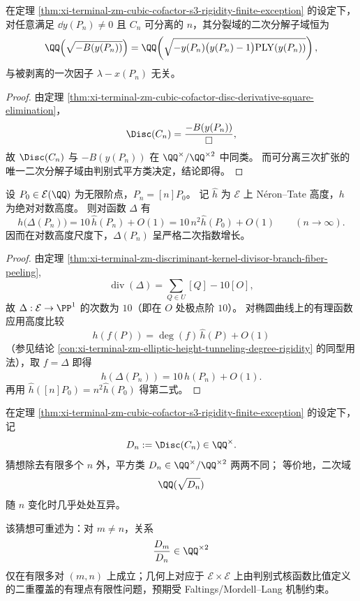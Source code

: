 \begin{corollary}[二次脊柱在一次剥离下的不变性]\label{cor:xi-terminal-zm-cubic-cofactor-quadratic-spine-invariance}
在定理 \ref{thm:xi-terminal-zm-cubic-cofactor-s3-rigidity-finite-exception} 的设定下，对任意满足 \(\dd y(P_n)\neq 0\) 且 \(C_n\) 可分离的 \(n\)，其分裂域的二次分解子域恒为
\[
\QQ\!\left(\sqrt{-B(y(P_n))}\right)
=\QQ\!\left(\sqrt{-y(P_n)\bigl(y(P_n)-1\bigr)\mathrm{PLY}(y(P_n))}\right),
\]
与被剥离的一次因子 \(\lambda-x(P_n)\) 无关。
\end{corollary}
\begin{proof}
由定理 \ref{thm:xi-terminal-zm-cubic-cofactor-disc-derivative-square-elimination}，
\[
\Disc(C_n)=\frac{-B(y(P_n))}{\square},
\]
故 \(\Disc(C_n)\) 与 \(-B(y(P_n))\) 在 \(\QQ^\times/\QQ^{\times2}\) 中同类。
而可分离三次扩张的唯一二次分解子域由判别式平方类决定，结论即得。
\end{proof}

\begin{theorem}[判别式核函数沿倍点序列的二次型高度增长]\label{thm:xi-terminal-zm-discriminant-kernel-height-quadratic-growth}
设 \(P_0\in \mathcal E(\QQ)\) 为无限阶点，\(P_n=[n]P_0\)。
记 \(\hat h\) 为 \(\mathcal E\) 上 N\'eron--Tate 高度，\(h\) 为绝对对数高度。
则对函数 \(\Delta\) 有
\[
h\!\bigl(\Delta(P_n)\bigr)=10\,\hat h(P_n)+O(1)
=10\,n^2\hat h(P_0)+O(1)\qquad (n\to\infty).
\]
因而在对数高度尺度下，\(\Delta(P_n)\) 呈严格二次指数增长。
\end{theorem}
\begin{proof}
由定理 \ref{thm:xi-terminal-zm-discriminant-kernel-divisor-branch-fiber-peeling},
\[
\operatorname{div}(\Delta)=\sum_{Q\in U}[Q]-10[O],
\]
故 \(\Delta:\mathcal E\to\PP^1\) 的次数为 \(10\)（即在 \(O\) 处极点阶 \(10\)）。
对椭圆曲线上的有理函数应用高度比较
\[
h(f(P))=\deg(f)\,\hat h(P)+O(1)
\]
（参见结论 \ref{con:xi-terminal-zm-elliptic-height-tunneling-degree-rigidity} 的同型用法），取 \(f=\Delta\) 即得
\[
h(\Delta(P_n))=10\,\hat h(P_n)+O(1).
\]
再用 \(\hat h([n]P_0)=n^2\hat h(P_0)\) 得第二式。
\end{proof}

\begin{conjecture}[判别式平方类注入性与二次脊柱的几乎处处互异]\label{conj:xi-terminal-zm-cubic-cofactor-disc-squareclass-injectivity}
在定理 \ref{thm:xi-terminal-zm-cubic-cofactor-s3-rigidity-finite-exception} 的设定下，记
\[
D_n:=\Disc(C_n)\in\QQ^\times.
\]
猜想除去有限多个 \(n\) 外，平方类 \(D_n\in \QQ^\times/\QQ^{\times2}\) 两两不同；
等价地，二次域
\[
\QQ(\sqrt{D_n})
\]
随 \(n\) 变化时几乎处处互异。

该猜想可重述为：对 \(m\neq n\)，关系
\[
\frac{D_m}{D_n}\in\QQ^{\times2}
\]
仅在有限多对 \((m,n)\) 上成立；几何上对应于 \(\mathcal E\times\mathcal E\) 上由判别式核函数比值定义的二重覆盖的有理点有限性问题，预期受 Faltings/Mordell--Lang 机制约束。
\end{conjecture}
